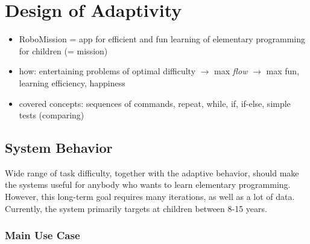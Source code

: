 \chapter{Design of Adaptivity}
\label{chap:design-of-adaptivity}

\begin{itemize}
\item RoboMission = app for efficient and fun learning of elementary programming for children (= mission)
\item how: entertaining problems of optimal difficulty $\rightarrow$ max \emph{flow} $\rightarrow$ max fun, learning efficiency, happiness
\item covered concepts: sequences of commands, repeat, while, if, if-else, simple tests (comparing)
\end{itemize}


\section{System Behavior}
\label{sec:robomission.behavior}

Wide range of task difficulty, together with the adaptive behavior,
should make the systems useful for anybody who wants to learn
elementary programming.
However, this long-term goal requires many iterations,
as well as a lot of data.
Currently, the system primarily targets at children between 8-15 years.

\subsection{Main Use Case}
\label{sec:robomission.use-case}

